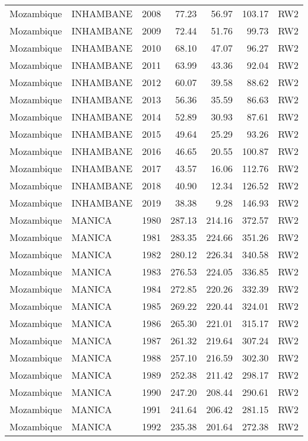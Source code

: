 \begin{longtable}{lllrrrl}
  Mozambique & INHAMBANE & 2008 & 77.23 & 56.97 & 103.17 & RW2 \\ 
  Mozambique & INHAMBANE & 2009 & 72.44 & 51.76 & 99.73 & RW2 \\ 
  Mozambique & INHAMBANE & 2010 & 68.10 & 47.07 & 96.27 & RW2 \\ 
  Mozambique & INHAMBANE & 2011 & 63.99 & 43.36 & 92.04 & RW2 \\ 
  Mozambique & INHAMBANE & 2012 & 60.07 & 39.58 & 88.62 & RW2 \\ 
  Mozambique & INHAMBANE & 2013 & 56.36 & 35.59 & 86.63 & RW2 \\ 
  Mozambique & INHAMBANE & 2014 & 52.89 & 30.93 & 87.61 & RW2 \\ 
  Mozambique & INHAMBANE & 2015 & 49.64 & 25.29 & 93.26 & RW2 \\ 
  Mozambique & INHAMBANE & 2016 & 46.65 & 20.55 & 100.87 & RW2 \\ 
  Mozambique & INHAMBANE & 2017 & 43.57 & 16.06 & 112.76 & RW2 \\ 
  Mozambique & INHAMBANE & 2018 & 40.90 & 12.34 & 126.52 & RW2 \\ 
  Mozambique & INHAMBANE & 2019 & 38.38 & 9.28 & 146.93 & RW2 \\ 
  Mozambique & MANICA & 1980 & 287.13 & 214.16 & 372.57 & RW2 \\ 
  Mozambique & MANICA & 1981 & 283.35 & 224.66 & 351.26 & RW2 \\ 
  Mozambique & MANICA & 1982 & 280.12 & 226.34 & 340.58 & RW2 \\ 
  Mozambique & MANICA & 1983 & 276.53 & 224.05 & 336.85 & RW2 \\ 
  Mozambique & MANICA & 1984 & 272.85 & 220.26 & 332.39 & RW2 \\ 
  Mozambique & MANICA & 1985 & 269.22 & 220.44 & 324.01 & RW2 \\ 
  Mozambique & MANICA & 1986 & 265.30 & 221.01 & 315.17 & RW2 \\ 
  Mozambique & MANICA & 1987 & 261.32 & 219.64 & 307.24 & RW2 \\ 
  Mozambique & MANICA & 1988 & 257.10 & 216.59 & 302.30 & RW2 \\ 
  Mozambique & MANICA & 1989 & 252.38 & 211.42 & 298.17 & RW2 \\ 
  Mozambique & MANICA & 1990 & 247.20 & 208.44 & 290.61 & RW2 \\ 
  Mozambique & MANICA & 1991 & 241.64 & 206.42 & 281.15 & RW2 \\ 
  Mozambique & MANICA & 1992 & 235.38 & 201.64 & 272.38 & RW2 \\ 

\end{longtable}
